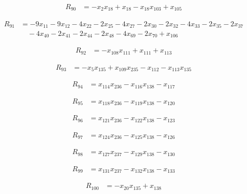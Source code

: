 \begin{align*}
R_{90} &= -x_{2} x_{18} +x_{18} -x_{18} x_{103} +x_{105}
\end{align*}

\begin{align*}
R_{91} &= -9 x_{11} -9 x_{12} -4 x_{22} -2 x_{25} -4 x_{27} -2 x_{30} -2 x_{32} -4 x_{33} -2 x_{35} -2 x_{37} \\
&\quad -4 x_{40} -2 x_{41} -2 x_{44} -2 x_{48} -4 x_{69} -2 x_{70} +x_{106}
\end{align*}

\begin{align*}
R_{92} &= -x_{108} x_{111} +x_{111} +x_{113}
\end{align*}

\begin{align*}
R_{93} &= -x_{5} x_{135} +x_{109} x_{235} -x_{112} -x_{113} x_{135}
\end{align*}

\begin{align*}
R_{94} &= x_{114} x_{236} -x_{116} x_{138} -x_{117}
\end{align*}

\begin{align*}
R_{95} &= x_{118} x_{236} -x_{119} x_{138} -x_{120}
\end{align*}

\begin{align*}
R_{96} &= x_{121} x_{236} -x_{122} x_{138} -x_{123}
\end{align*}

\begin{align*}
R_{97} &= x_{124} x_{236} -x_{125} x_{138} -x_{126}
\end{align*}

\begin{align*}
R_{98} &= x_{127} x_{237} -x_{129} x_{138} -x_{130}
\end{align*}

\begin{align*}
R_{99} &= x_{131} x_{237} -x_{132} x_{138} -x_{133}
\end{align*}

\begin{align*}
R_{100} &= -x_{20} x_{135} +x_{138}
\end{align*}

